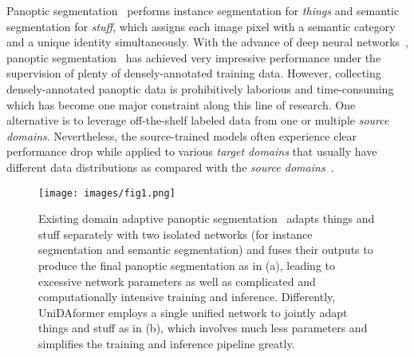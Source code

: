 \documentclass[10pt,twocolumn,letterpaper]{article}
\begin{document}
Panoptic segmentation~\cite{kirillov2019panoptic} performs instance segmentation for \textit{things} and semantic segmentation for \textit{stuff}, which assigns each image pixel with a semantic category and a unique identity simultaneously. With the advance of deep neural networks~\cite{krizhevsky2012alexnet,he2016resnet,chen2017deeplab,hoffman2016fcns,ren2015fasterrcnn,he2017mask}, panoptic segmentation~\cite{kirillov2019panoptic,li2019aunet,kirillov2019panopticfpn,xiong2019upsnet,carion2020detr,cheng2020panoptic,li2021fullypanoptic,wang2021maxdeeplab,cheng2021maskformer,cheng2021masked} has achieved very impressive performance under the supervision of plenty of densely-annotated training data. However, collecting densely-annotated panoptic data is prohibitively laborious and time-consuming~\cite{deng2009imagenet,coco,cordts2016cityscapes} which has become one major constraint along this line of research. One alternative is to leverage off-the-shelf labeled data from one or multiple \textit{source domains}. Nevertheless, the source-trained models often experience clear performance drop while applied to various \textit{target domains} that usually have different data distributions as compared with the \textit{source domains}~\cite{huang2021cvrn}.

\begin{figure}[t]
\centering
\texttt{[image: images/fig1.png]}
\caption{
Existing domain adaptive panoptic segmentation~\cite{huang2021cvrn} adapts things and stuff separately with two isolated networks (for instance segmentation and semantic segmentation) and fuses their outputs to produce the final panoptic segmentation as in (a), leading to excessive network parameters as well as complicated and computationally intensive training and inference. Differently, UniDAformer employs a single unified network to jointly adapt things and stuff as in (b), which involves much less parameters and simplifies the training and inference pipeline greatly.
}
\label{fig:intro}
\end{figure}
\end{document}

